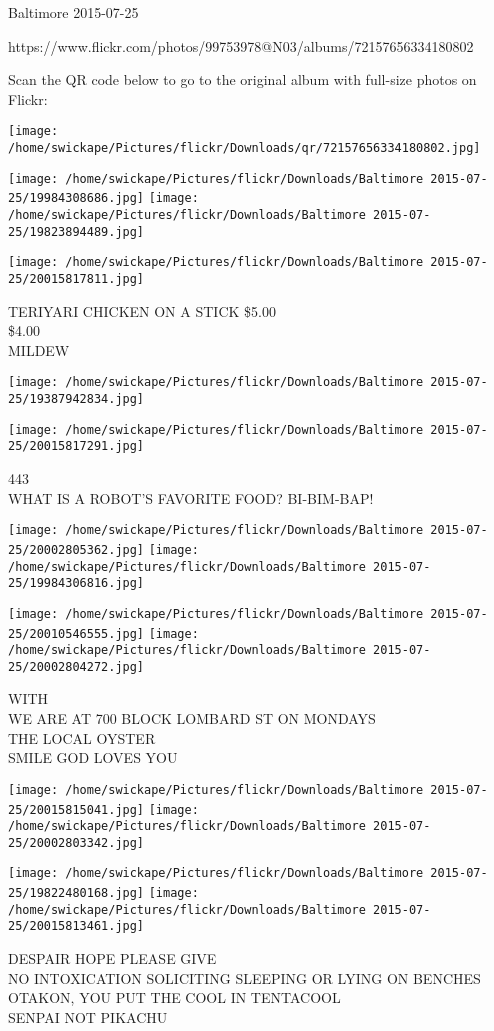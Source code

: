 \documentclass[10pt,letterpaper]{article}
\begin{document}
Baltimore 2015-07-25

https://www.flickr.com/photos/99753978@N03/albums/72157656334180802

Scan the QR code below to go to the original album with full-size photos on Flickr:

\texttt{[image: /home/swickape/Pictures/flickr/Downloads/qr/72157656334180802.jpg]}
\pagebreak

\texttt{[image: /home/swickape/Pictures/flickr/Downloads/Baltimore 2015-07-25/19984308686.jpg]}
\texttt{[image: /home/swickape/Pictures/flickr/Downloads/Baltimore 2015-07-25/19823894489.jpg]}

\texttt{[image: /home/swickape/Pictures/flickr/Downloads/Baltimore 2015-07-25/20015817811.jpg]}

TERIYARI CHICKEN ON A STICK \$5.00\\
\$4.00\\
MILDEW
\pagebreak

\texttt{[image: /home/swickape/Pictures/flickr/Downloads/Baltimore 2015-07-25/19387942834.jpg]}

\vspace{0.25in}
\texttt{[image: /home/swickape/Pictures/flickr/Downloads/Baltimore 2015-07-25/20015817291.jpg]}

443\\
WHAT IS A ROBOT'S FAVORITE FOOD?  BI{-}BIM{-}BAP!
\pagebreak

\texttt{[image: /home/swickape/Pictures/flickr/Downloads/Baltimore 2015-07-25/20002805362.jpg]}
\texttt{[image: /home/swickape/Pictures/flickr/Downloads/Baltimore 2015-07-25/19984306816.jpg]}

\texttt{[image: /home/swickape/Pictures/flickr/Downloads/Baltimore 2015-07-25/20010546555.jpg]}
\texttt{[image: /home/swickape/Pictures/flickr/Downloads/Baltimore 2015-07-25/20002804272.jpg]}

WITH\\
WE ARE AT 700 BLOCK LOMBARD ST ON MONDAYS\\
THE LOCAL OYSTER\\
SMILE GOD LOVES YOU
\pagebreak

\texttt{[image: /home/swickape/Pictures/flickr/Downloads/Baltimore 2015-07-25/20015815041.jpg]}
\texttt{[image: /home/swickape/Pictures/flickr/Downloads/Baltimore 2015-07-25/20002803342.jpg]}

\texttt{[image: /home/swickape/Pictures/flickr/Downloads/Baltimore 2015-07-25/19822480168.jpg]}
\texttt{[image: /home/swickape/Pictures/flickr/Downloads/Baltimore 2015-07-25/20015813461.jpg]}

DESPAIR HOPE PLEASE GIVE\\
NO INTOXICATION SOLICITING SLEEPING OR LYING ON BENCHES\\
OTAKON, YOU PUT THE COOL IN TENTACOOL\\
SENPAI NOT PIKACHU
\pagebreak
\end{document}
